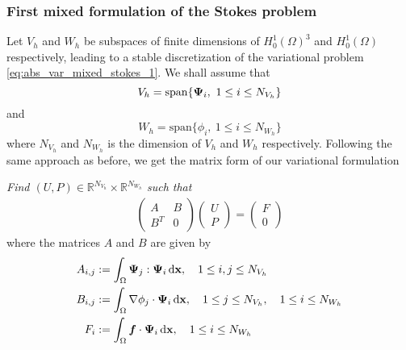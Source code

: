 \subsubsection*{First mixed formulation of the Stokes problem}
%
Let $V_h$ and $W_h$ be subspaces of finite dimensions of $H^1_0(\Omega)^3$ and $H^1_0(\Omega)$ respectively, leading to a stable discretization of the variational problem \eqref{eq:abs_var_mixed_stokes_1}.
We shall assume that 
$$V_h = \mathrm{span}\{ \boldsymbol{\Psi}_{i}, ~ 1 \leq i \leq N_{V_h} \}$$ 
and
$$W_h = \mathrm{span}\{ \phi_{i}, ~ 1 \leq i \leq N_{W_h} \}$$ 
where $N_{V_h}$ and $N_{W_h}$ is the dimension of $V_h$ and $W_h$ respectively.
Following the same approach as before, we get the matrix form of our variational formulation
\begin{tcolorbox}
  {\em Find $(U,P) \in \mathbb{R}^{N_{V_h}} \times \mathbb{R}^{N_{W_h}}$ such that}
  \begin{align}
    \begin{pmatrix}
      A   & B \\
      B^T & 0 
    \end{pmatrix}
    \begin{pmatrix} U \\ P \end{pmatrix}
    = \begin{pmatrix} F \\ 0 \end{pmatrix}
  \end{align}
  where the matrices $A$ and $B$ are given by
  \begin{align*}
    A_{i, j} &:= \int_{\Omega} \boldsymbol{\Psi}_{j} : \boldsymbol{\Psi}_{i} \,{\rm d} \mathbf{x}  
    ,  \quad 1 \leq i, j \leq N_{V_h}
    \\
    B_{i, j} &:= \int_{\Omega} \nabla \phi_{j} \cdot \boldsymbol{\Psi}_{i} \,{\rm d} \mathbf{x}  
    ,  \quad 1 \leq j \leq N_{V_h} 
    , \quad 1 \leq i \leq N_{W_h} 
    \\
    F_{i} &:= \int_{\Omega} \bm{f} \cdot \boldsymbol{\Psi}_{i} \,{\rm d} \mathbf{x} 
    , \quad 1 \leq i \leq N_{W_h} 
  \end{align*}
  \label{tcb:mixed_stokes_1}
\end{tcolorbox}

